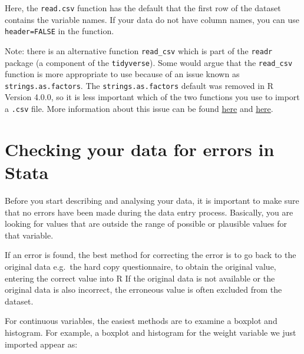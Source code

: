 \documentclass[
]{memoir}
\newenvironment{Shaded}{\begin{snugshade}}{\end{snugshade}}
\newcommand{\AttributeTok}[1]{\textcolor[rgb]{0.77,0.63,0.00}{#1}}
\newcommand{\FunctionTok}[1]{\textcolor[rgb]{0.00,0.00,0.00}{#1}}
\newcommand{\NormalTok}[1]{#1}
\newcommand{\SpecialCharTok}[1]{\textcolor[rgb]{0.00,0.00,0.00}{#1}}
\newcommand{\StringTok}[1]{\textcolor[rgb]{0.31,0.60,0.02}{#1}}
\begin{document}
Here, the \texttt{read.csv} function has the default that the first row of the dataset contains the variable names. If your data do not have column names, you can use \texttt{header=FALSE} in the function.

Note: there is an alternative function \texttt{read\_csv} which is part of the \texttt{readr} package (a component of the \texttt{tidyverse}). Some would argue that the \texttt{read\_csv} function is more appropriate to use because of an issue known as \texttt{strings.as.factors}. The \texttt{strings.as.factors} default was removed in R Version 4.0.0, so it is less important which of the two functions you use to import a \texttt{.csv} file. More information about this issue can be found \href{https://simplystatistics.org/posts/2015-07-24-stringsasfactors-an-unauthorized-biography}{here} and \href{https://developer.r-project.org/Blog/public/2020/02/16/stringsasfactors/}{here}.

\hypertarget{checking-your-data-for-errors-in-stata}{%
\section{Checking your data for errors in Stata}\label{checking-your-data-for-errors-in-stata}}

Before you start describing and analysing your data, it is important to make sure that no errors have been made during the data entry process. Basically, you are looking for values that are outside the range of possible or plausible values for that variable.

If an error is found, the best method for correcting the error is to go back to the original data e.g.~the hard copy questionnaire, to obtain the original value, entering the correct value into R If the original data is not available or the original data is also incorrect, the erroneous value is often excluded from the dataset.

For continuous variables, the easiest methods are to examine a boxplot and histogram. For example, a boxplot and histogram for the weight variable we just imported appear as:

\begin{Shaded}
\end{Shaded}
\end{document}
